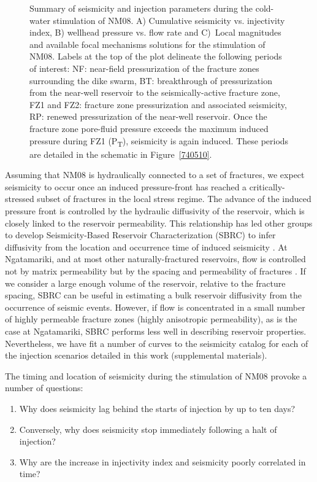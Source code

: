 \begin{figure}[p]
\begin{center}
\caption{{Summary of seismicity and injection parameters during the cold-water
stimulation of NM08. A) Cumulative seismicity vs. injectivity index, B)
wellhead pressure vs. flow rate and C)~Local magnitudes and available
focal mechanisms solutions for the stimulation of NM08. Labels at the
top of the plot delineate the following periods of interest: NF:
near-field pressurization of the fracture zones surrounding the dike
swarm, BT: breakthrough of pressurization from the near-well reservoir
to the seismically-active fracture zone, FZ1 and FZ2: fracture zone
pressurization and associated seismicity, RP: renewed pressurization of
the near-well reservoir. Once the fracture zone pore-fluid pressure
exceeds the maximum induced pressure during FZ1 (P\textsubscript{T}),
seismicity is again induced. These periods are detailed in the schematic
in Figure~{\ref{740510}}.
{\label{645772}}%
}}
\end{center}
\end{figure}

Assuming that NM08 is hydraulically connected to a set of fractures, we expect seismicity to occur once an induced pressure-front has reached a critically-stressed subset of fractures in the local stress regime. The advance of the induced pressure front is controlled by the hydraulic diffusivity of the reservoir, which is closely linked to the reservoir permeability. This relationship has led other groups to develop Seismicity-Based Reservoir Characterization (SBRC) to infer diffusivity from the location and occurrence time of induced seismicity \citep[e.g.][]{Shapiro_2002,Shapiro_2009,Parotidis_2004,Jeanne_2015deformation}. At Ngatamariki, and at most other naturally-fractured reservoirs, flow is controlled not by matrix permeability but by the spacing and permeability of fractures \citep{Grant_2011}. If we consider a large enough volume of the reservoir, relative to the fracture spacing, SBRC can be useful in estimating a bulk reservoir diffusivity from the occurrence of seismic events. However, if flow is concentrated in a small number of highly permeable fracture zones (highly anisotropic permeability), as is the case at Ngatamariki, SBRC performs less well in describing reservoir properties. Nevertheless, we have fit a number of curves to the seismicity catalog for each of the injection scenarios detailed in this work (supplemental materials).

The timing and location of seismicity during the stimulation of NM08 provoke a number of questions:
\begin{enumerate}
    \item Why does seismicity lag behind the starts of injection by up to ten days?
    \item Conversely, why does seismicity stop immediately following a halt of injection?
    \item Why are the increase in injectivity index and seismicity poorly correlated in time?
\end{enumerate}

